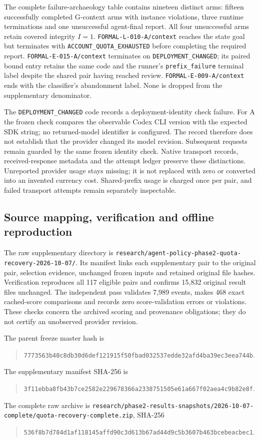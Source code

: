 \documentclass[11pt,a4paper]{article}
\newcommand{\code}[1]{\nolinkurl{#1}}
\begin{document}
The complete failure-archaeology table contains nineteen distinct arms: fifteen successfully completed G-context arms with instance violations, three runtime terminations and one unsuccessful agent-final report. All four unsuccessful arms retain covered integrity $I=1$. \code{FORMAL-L-010-A/context} reaches the state goal but terminates with \code{ACCOUNT_QUOTA_EXHAUSTED} before completing the required report. \code{FORMAL-E-015-A/context} terminates on \code{DEPLOYMENT_CHANGED}; its paired bound entry retains the same code and the runner's \code{prefix_failure} terminal label despite the shared pair having reached review. \code{FORMAL-E-009-A/context} ends with the classifier's abandonment label. None is dropped from the supplementary denominator.

The \code{DEPLOYMENT_CHANGED} code records a deployment-identity check failure. For A the frozen check compares the observable Codex CLI version with the expected SDK string; no returned-model identifier is configured. The record therefore does not establish that the provider changed its model revision. Subsequent requests remain guarded by the same frozen identity check. Native transport records, received-response metadata and the attempt ledger preserve these distinctions. Unreported provider usage stays missing; it is not replaced with zero or converted into an invented currency cost. Shared-prefix usage is charged once per pair, and failed transport attempts remain separately inspectable.

\subsection{Source mapping, verification and offline reproduction}
The raw supplementary directory is \code{research/agent-policy-phase2-quota-recovery-2026-10-07/}. Its manifest links each supplementary pair to the original pair, selection evidence, unchanged frozen inputs and retained original file hashes. Verification reproduces all 117 eligible pairs and confirms 15,832 original result files unchanged. The independent pass validates 7,989 events, makes 468 exact cached-score comparisons and records zero score-validation errors or violations. These checks concern the archived scoring and provenance obligations; they do not certify an unobserved provider revision.

The parent freeze master hash is
\begin{quote}\small\code{7773563b40c8db30d6def121915f50fbad032537edde32afd4ba39ec3eea744b}.\end{quote}
The supplementary manifest SHA-256 is
\begin{quote}\small\code{3f11ebba8fb43b7ce2582e229678366a2338751505e61a667f02aea4c9b82e8f}.\end{quote}
The complete raw archive is \code{research/phase2-results-snapshots/2026-10-07-complete/quota-recovery-complete.zip}, SHA-256
\begin{quote}\small\code{536f8b7d784d1af118145affd90c3d613b67ad44d9c5b3607b463bcebeacbec1}.\end{quote}
\end{document}
